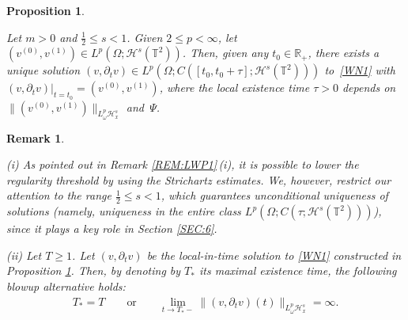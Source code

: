 \documentclass[letterpaper, 11pt,  reqno]{amsart}
\newtheorem{proposition}[theorem]{Proposition}
\newtheorem{remark}[theorem]{Remark}
\newcommand{\1}{\hspace{0.5mm}\text{I}\hspace{0.2mm}}
\newcommand{\noi}{\noindent}
\newcommand{\R}{\mathbb{R}}
\newcommand{\T}{\mathbb{T}}
\renewcommand{\H}{\mathcal{H}}
\newcommand{\dt}{\partial_t}
\renewcommand{\O}{\Omega}
\renewcommand{\o}{\omega}
\numberwithin{equation}{section}
\numberwithin{theorem}{section}
\begin{document}
\begin{proposition}
\label{PROP:LWP2}


Let  $m > 0$ and  $\frac 12 \le s < 1$. %
Given  $2 \le p < \infty$, 
let  $(v^{(0)}, v^{(1)}) \in L^p (\Omega; \H^s (\T^2) )$.
Then, given any $t_0 \in \R_+$, 
there exists a unique solution $(v, \dt v) \in L^p(\O; C([t_0, t_0+ \tau]; \H^s(\T^2)))$
to~\eqref{WN1}
with $(v, \dt v)|_{ t= t_0} = (v^{(0)}, v^{(1)})$, 
where the local existence time $\tau > 0$ depends
on 
$\|(v^{(0)}, v^{(1)})\|_{L^p_\o \H^s_x}$ and~$\Psi$.
\end{proposition} 


\begin{remark}
\label{REM:LWP2} \rm


(i)
As pointed out in Remark \ref{REM:LWP1}\,(i), 
it is possible to lower the regularity threshold
by using the Strichartz estimates.
We, however, 
restrict our attention to the range $\frac 12 \le s < 1$,
which guarantees
unconditional uniqueness
of solutions
(namely, uniqueness
 in the entire class 
$L^p(\O; C(\tau; \H^s(\T^2)))$), 
since it
plays a key role in Section \ref{SEC:6}.

 
 
\smallskip

\noi
(ii) Let $T \ge 1$.
Let $(v, \dt v)$ be the local-in-time solution 
to \eqref{WN1} constructed in Proposition \ref{PROP:LWP2}.
Then, 
by denoting by $T_*$ its maximal existence time, 
the following blowup alternative holds:
\begin{align}
T_* = T\qquad \text{or}\qquad 
\lim_{t \to T_*-}
\| (v, \dt v)(t)\|_{L^p_\o \H^s_x}
= \infty.
\label{blow2}
\end{align}


 
\end{remark}
\end{document}
